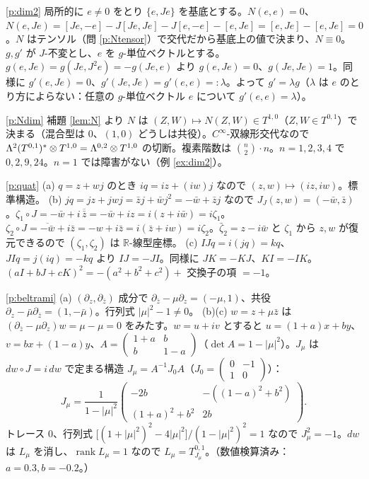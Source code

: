 \begin{sol}{\ref{p:dim2}}
局所的に $e\ne0$ をとり $\{e,Je\}$ を基底とする。$N(e,e)=0$、$N(e,Je)=[Je,-e]-J[Je,Je]-J[e,-e]-[e,Je]=[e,Je]-[e,Je]=0$。$N$ はテンソル（問 \ref{p:Ntensor}）で交代だから基底上の値で決まり、$N\equiv0$。
$g,g'$ が $J$-不変とし、$e$ を $g$-単位ベクトルとする。$g(e,Je)=g(Je,J^2e)=-g(Je,e)$ より $g(e,Je)=0$、$g(Je,Je)=1$。同様に $g'(e,Je)=0$、$g'(Je,Je)=g'(e,e)=:\lambda$。よって $g'=\lambda g$（$\lambda$ は $e$ のとり方によらない：任意の $g$-単位ベクトル $e$ について $g'(e,e)=\lambda$）。
\end{sol}
\begin{sol}{\ref{p:Ndim}}
補題 \ref{lem:N} より $N$ は $(Z,W)\mapsto N(Z,W)\in T^{1,0}$（$Z,W\in T^{0,1}$）で決まる（混合型は $0$、$(1,0)$ どうしは共役）。$C^\infty$-双線形交代なので $\Lambda^2(T^{0,1})^*\otimes T^{1,0}=\Lambda^{0,2}\otimes T^{1,0}$ の切断。複素階数は $\binom n2\cdot n$。$n=1,2,3,4$ で $0,2,9,24$。$n=1$ では障害がない（例 \ref{ex:dim2}）。
\end{sol}
\begin{sol}{\ref{p:quat}}
(a) $q=z+wj$ のとき $iq=iz+(iw)j$ なので $(z,w)\mapsto(iz,iw)$。標準構造。
(b) $jq=jz+jwj=\bar zj+\bar wj^2=-\bar w+\bar zj$ なので $J_J(z,w)=(-\bar w,\bar z)$。$\zeta_1\circ J=-\bar w+i\,\overline{\bar z}=-\bar w+iz=i(z+i\bar w)=i\zeta_1$。$\zeta_2\circ J=\overline{-\bar w}+i\bar z=-w+i\bar z=i(\bar z+iw)=i\zeta_2$。$\bar\zeta_2=z-i\bar w$ と $\zeta_1$ から $z,w$ が復元できるので $(\zeta_1,\zeta_2)$ は $\mathbb R$-線型座標。
(c) $IJq=i(jq)=kq$、$JIq=j(iq)=-kq$ より $IJ=-JI$。同様に $JK=-KJ$、$KI=-IK$。$(aI+bJ+cK)^2=-(a^2+b^2+c^2)+$ 交換子の項 $=-1$。
\end{sol}
\begin{sol}{\ref{p:beltrami}}
(a) $(\partial_z,\partial_{\bar z})$ 成分で $\partial_{\bar z}-\mu\partial_z=(-\mu,1)$、共役 $\partial_z-\bar\mu\partial_{\bar z}=(1,-\bar\mu)$。行列式 $|\mu|^2-1\ne0$。
(b)(c) $w=z+\mu\bar z$ は $(\partial_{\bar z}-\mu\partial_z)w=\mu-\mu=0$ をみたす。$w=u+iv$ とすると $u=(1+a)x+by$、$v=bx+(1-a)y$、$A=\begin{pmatrix}1+a&b\\b&1-a\end{pmatrix}$（$\det A=1-|\mu|^2$）。$J_\mu$ は $dw\circ J=i\,dw$ で定まる構造 $J_\mu=A^{-1}J_0A$（$J_0=\begin{pmatrix}0&-1\\1&0\end{pmatrix}$）：
\[
J_\mu=\frac1{1-|\mu|^2}\begin{pmatrix}-2b&-((1-a)^2+b^2)\\(1+a)^2+b^2&2b\end{pmatrix}.
\]
トレース $0$、行列式 $\big[(1+|\mu|^2)^2-4|\mu|^2\big]/(1-|\mu|^2)^2=1$ なので $J_\mu^2=-1$。$dw$ は $L_\mu$ を消し、$\operatorname{rank}L_\mu=1$ なので $L_\mu=T^{0,1}_{J_\mu}$。（数値検算済み：$a=0.3,b=-0.2$。）
\end{sol}
